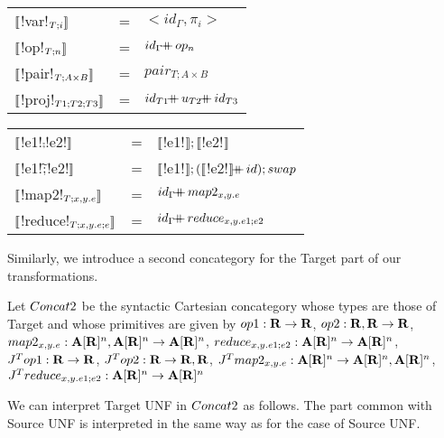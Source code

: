 \begin{tabular}{l c l}
   $\llbracket$!var!$_{T;i} \rrbracket$ &=& $<id_\Gamma,\pi_i>$ \\
   $\llbracket$!op!$_{T;n} \rrbracket$ &=& $id_\Gamma\concatcomp op_n$\\
   $\llbracket$!pair!$_{T;A\times B} \rrbracket$ &=& $pair_{T;A\times B}$ \\
   $\llbracket$!proj!$_{T1;T2;T3} \rrbracket$ &=& $id_{T1}\concatcomp u_{T2}\concatcomp id_{T3}$
    \end{tabular}
   \begin{tabular}{l c l}
   $\llbracket$!e1!$\comp$!e2!$\rrbracket$  &=& $\llbracket$!e1!$\rrbracket ; \llbracket$!e2!$\rrbracket$ \\
   $\llbracket$!e1!$\widetilde{;}$!e2!$\rrbracket$ &=& $\llbracket$!e1!$\rrbracket ; (\llbracket$!e2!$\semr\concatcomp id )\comp swap$ \\
   $\llbracket$!map2!$_{T;x,y.e}\rrbracket$  &=& $id_\Gamma\concatcomp map2_{x,y.e}$ \\
   $\llbracket$!reduce!$_{T;x,y.e;e}\rrbracket$ &=& $id_\Gamma\concatcomp reduce_{x,y.e1;e2}$
\end{tabular}

Similarly, we introduce a second concategory for the Target part of our transformations.

\begin{definition}[$\ConcatT$]
Let $\ConcatT$ be the syntactic Cartesian concategory whose types are those of Target and 
whose primitives are given by 
$op1: \mathbf{R} \to \mathbf{R}$, 
$op2: \mathbf{R},\mathbf{R} \to \mathbf{R}$, 
$map2_{x,y.e}: \mathbf{A}[\mathbf{R}]^{n},\mathbf{A}[\mathbf{R}]^{n}\to \mathbf{A}[\mathbf{R}]^{n}$, 
$reduce_{x,y.e1;e2}: \mathbf{A}[\mathbf{R}]^{n} \to \mathbf{A}[\mathbf{R}]^{n}$, 
$J^Top1: \mathbf{R} \to \mathbf{R}$, 
$J^Top2: \mathbf{R} \to \mathbf{R}, \mathbf{R}$, 
$J^Tmap2_{x,y.e}: \mathbf{A}[\mathbf{R}]^{n} \to \mathbf{A}[\mathbf{R}]^{n}, \mathbf{A}[\mathbf{R}]^{n}$, 
$J^Treduce_{x,y.e1;e2}: \mathbf{A}[\mathbf{R}]^{n} \to \mathbf{A}[\mathbf{R}]^{n}$ 
\end{definition}

We can interpret Target UNF in $\ConcatT$ as follows. 
The part common with Source UNF is interpreted in the same way as for the case of Source UNF.

